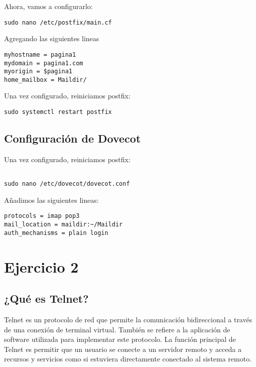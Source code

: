 \documentclass{article}
\begin{document}
 

Ahora, vamos a configurarlo:
\lstset{language=Bash, breaklines=true, basicstyle=\footnotesize}
\begin{lstlisting}[frame=single]
sudo nano /etc/postfix/main.cf
\end{lstlisting}

Agregando las siguientes lineas
\lstset{language=Bash, breaklines=true, basicstyle=\footnotesize}
\begin{lstlisting}[frame=single]
myhostname = pagina1
mydomain = pagina1.com
myorigin = $pagina1
home_mailbox = Maildir/
\end{lstlisting}

Una vez configurado, reiniciamos postfix:
\lstset{language=Bash, breaklines=true, basicstyle=\footnotesize}
\begin{lstlisting}[frame=single]
sudo systemctl restart postfix
\end{lstlisting}


\subsection{Configuración de Dovecot}
Una vez configurado, reiniciamos postfix:
\lstset{language=Bash, breaklines=true, basicstyle=\footnotesize}
\begin{lstlisting}[frame=single]

sudo nano /etc/dovecot/dovecot.conf
\end{lstlisting}

Añadimos las siguientes lineas:
\lstset{language=Bash, breaklines=true, basicstyle=\footnotesize}
\begin{lstlisting}[frame=single]
protocols = imap pop3
mail_location = maildir:~/Maildir
auth_mechanisms = plain login
\end{lstlisting}


\section{Ejercicio 2}
\subsection{¿Qué es Telnet?}
Telnet es un protocolo de red que permite la comunicación bidireccional a través de una conexión de terminal virtual. También se refiere a la aplicación de software utilizada para implementar este protocolo. La función principal de Telnet es permitir que un usuario se conecte a un servidor remoto y acceda a recursos y servicios como si estuviera directamente conectado al sistema remoto.
\end{document}
